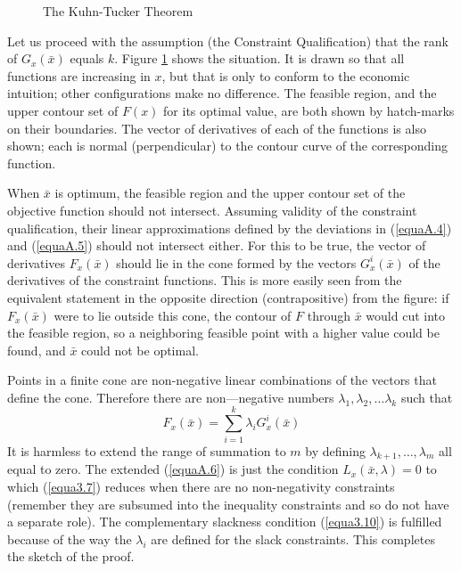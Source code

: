 \begin{appendices}
\begin{figure}[!htb]
\caption{The Kuhn-Tucker Theorem} %
\label{FigA.2} %
\end{figure}
Let us proceed with the assumption (the Constraint Qualification) that the rank of $G_x(\bar{x})$ equals $k$. Figure \ref{FigA.2} shows the situation. It is drawn so that all functions are increasing in $x$, but that is only to conform to the economic intuition; other configurations make no difference. The feasible region, and the upper contour set of $F(x)$ for its optimal value, are both shown by hatch-marks on their boundaries. The vector of derivatives of each of the functions is also shown; each is normal (perpendicular) to the contour curve of the corresponding function.

When $\bar{x}$ is optimum, the feasible region and the upper contour set of the objective function should not intersect. Assuming validity of the constraint qualification, their linear approximations defined by the deviations in (\ref{equaA.4}) and (\ref{equaA.5}) should not intersect either. For this to be true, the vector of derivatives $F_x(\bar{x})$ should lie in the cone formed by the vectors $G_x^i(\bar{x})$ of the derivatives of the constraint functions. This is more easily seen from the equivalent statement in the opposite direction (contrapositive) from the figure: if $F_x(\bar{x})$ were to lie outside this cone, the contour of $F$ through $\bar{x}$ would cut into the feasible region, so a neighboring feasible point with a higher value could be found, and $\bar{x}$ could not be optimal.

Points in a finite cone are non-negative linear combinations of the vectors that define the cone. Therefore there are non—negative numbers $\lambda_1, \lambda_2, \dots \lambda_k $ such that
\begin{equation} \label{equaA.6}
 F_x(\bar{x}) = \sum\limits_{i=1}^k \lambda_i G_x^i(\bar{x})
\end{equation}
It is harmless to extend the range of summation to $m$ by defining $\lambda_{k+1}, \dots, \lambda_m$ all equal to zero. The extended (\ref{equaA.6}) is just the condition $L_x( \bar{x}, \lambda) = 0$ to which (\ref{equa3.7}) reduces when there are no non-negativity constraints (remember they are subsumed into the inequality constraints and so do not have a separate role). The complementary slackness condition (\ref{equa3.10}) is fulfilled because of the way the $\lambda_i$ are defined for the slack constraints. This completes the sketch of the proof.

\end{appendices}






